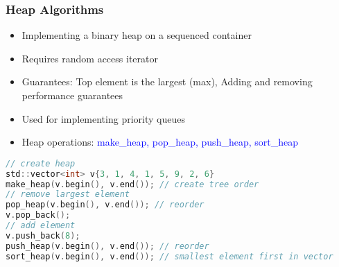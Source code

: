 \subsubsection{Heap Algorithms}
\begin{itemize}
    \item Implementing a binary heap on a sequenced container
    \item Requires random access iterator
    \item Guarantees: Top element is the largest (max), Adding and removing performance guarantees
    \item Used for implementing priority queues
    \item Heap operations: \textcolor{blue}{make\_heap, pop\_heap, push\_heap, sort\_heap}
\end{itemize}
\begin{lstlisting}[style=frame, style= linenumbers, language=C]
// create heap
std::vector<int> v{3, 1, 4, 1, 5, 9, 2, 6}
make_heap(v.begin(), v.end()); // create tree order
// remove largest element
pop_heap(v.begin(), v.end()); // reorder
v.pop_back();
// add element
v.push_back(8);
push_heap(v.begin(), v.end()); // reorder
sort_heap(v.begin(), v.end()); // smallest element first in vector
\end{lstlisting}

